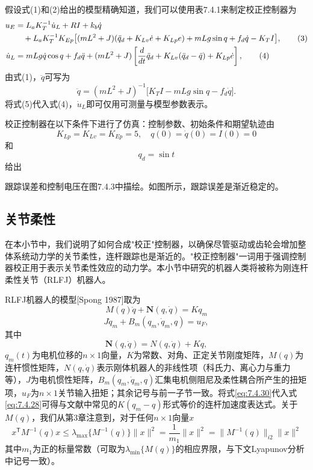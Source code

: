 \documentclass[UTF8]{ctexart}
\begin{document}
假设式(1)和(2)给出的模型精确知道，我们可以使用表7.4.1来制定校正控制器为
\begin{align}
u_E &= L_a K_T^{-1}\dot{u}_L + RI + k_b\dot{q} \notag \\
&\quad {} + L_a K_T^{-1}K_{Ep}\bigl[(mL^2 + J)(\ddot{q}_d + K_{Lv}\dot{e} + K_{Lp}e) + mLg\sin q + f_d\dot{q} - K_T I\bigr], \tag{3} \\
\dot{u}_L &= mLg\dot{q}\cos q + f_d\ddot{q} + (mL^2 + J)\left[\frac{d}{dt}\ddot{q}_d + K_{Lv}(\ddot{q}_d - \ddot{q}) + K_{Lp}\dot{e}\right], \tag{4}
\end{align}
由式(1)，$\ddot{q}$可写为
\begin{equation}
\ddot{q} = (mL^2 + J)^{-1}\bigl[K_T I - mLg\sin q - f_d\dot{q}\bigr]. \tag{5}
\end{equation}
将式(5)代入式(4)，$\dot{u}_L$即可仅用可测量与模型参数表示。

校正控制器在以下条件下进行了仿真：控制参数、初始条件和期望轨迹由
\begin{equation*}
K_{Lp} = K_{Lv} = K_{Ep} = 5, \quad q(0) = \dot{q}(0) = I(0) = 0
\end{equation*}
和
\begin{equation*}
q_d = \sin t
\end{equation*}
给出

跟踪误差和控制电压在图7.4.3中描绘。如图所示，跟踪误差是渐近稳定的。

\subsection{关节柔性}

在本小节中，我们说明了如何合成"校正"控制器，以确保尽管驱动或齿轮会增加整体系统动力学的关节柔性，连杆跟踪也是渐近的。"校正控制器"一词用于强调控制器校正用于表示关节柔性效应的动力学。本小节中研究的机器人类将被称为刚连杆柔性关节（RLFJ）机器人。

RLFJ机器人的模型[Spong 1987]取为
\begin{equation}\label{eq:7.4.28}
M(q)\ddot{q} + \mathbf{N}(q,\dot{q}) = K q_m
\end{equation}
\begin{equation}\label{eq:7.4.29}
J\ddot{q}_m + B_m(q_m,\dot{q}_m,q) = u_F,
\end{equation}
其中
\begin{equation}\label{eq:7.4.30}
\mathbf{N}(q,\dot{q}) = N(q,\dot{q}) + K q,
\end{equation}
$q_m(t)$为电机位移的$n \times 1$向量，$K$为常数、对角、正定关节刚度矩阵，$M(q)$为连杆惯性矩阵，$N(q,\dot{q})$表示刚体机器人的非线性项（科氏力、离心力与重力等），$J$为电机惯性矩阵，$B_m(q_m,\dot{q}_m,q)$汇集电机侧阻尼及柔性耦合所产生的扭矩项，$u_F$为$n \times 1$关节输入扭矩；其余记号与前一子节一致。将式\eqref{eq:7.4.30}代入式\eqref{eq:7.4.28}可得与文献中常见的$K(q_m-q)$形式等价的连杆加速度表达式。关于$M(q)$，我们从第3章注意到，对于任何$n \times 1$向量$x$
\begin{equation}\label{eq:7.4.31}
x^{\mathsf T} M^{-1}(q) x \leq \lambda_{\max}\{M^{-1}(q)\}\|x\|^2 = \frac{1}{m_1}\|x\|^2 = \|M^{-1}(q)\|_{i2}\|x\|^2
\end{equation}
其中$m_1$为正的标量常数（可取为$\lambda_{\min}\{M(q)\}$的相应界限，与下文Lyapunov分析中记号一致）。
\end{document}
